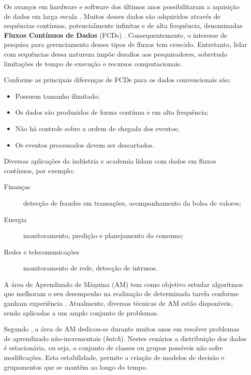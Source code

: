 \documentclass[qual, classic, a4paper]{ufbathesis}
\begin{document}
Os avanços em hardware e software dos últimos anos possibilitaram a aquisição de dados em larga escala \cite{Aggarwal:2003:FCE:1315451.1315460}.
Muitos desses dados são adquiridos através de sequências contínuas, potencialmente infinitas e de alta frequência, 
denominadas \textbf{Fluxos Contínuos de Dados} (FCDs) \cite{Aggarwal:2003:FCE:1315451.1315460, Gama:2010:KDD:1855075, GamaMCR04}.
Consequentemente, o interesse de pesquisa para gerenciamento desses tipos de fluxos tem crescido.
Entretanto, lidar com sequências dessa natureza impõe desafios aos pesquisadores, sobretudo limitações de tempo de execução e recursos computacionais.

Conforme \cite{Babcock:2002:MID:543613.543615} as principais diferenças de FCDs para os dados convencionais são:
\begin{itemize}
    \item Possuem tamanho ilimitado;
    \item Os dados são produzidos de forma contínua e em alta frequência;
    \item Não há controle sobre a ordem de chegada dos eventos;
    \item Os eventos processados devem ser descartados.
\end{itemize}

Diversas aplicações da indústria e academia lidam com dados em fluxos contínuos, por exemplo:

\begin{description}
    \item[Finanças] detecção de fraudes em transações, acompanhamento da bolsa de valores;
    \item[Energia] monitoramento, predição e planejamento do consumo;
    \item[Redes e telecomunicações] monitoramento de rede, detecção de intrusos.
\end{description}

A área de Aprendizado de Máquina (AM) tem como objetivo estudar algoritmos que melhoram o seu desempenho na realização de determinada tarefa conforme ganham experiência \cite{Mitchell:1997:ML:541177}.
Atualmente, diversas técnicas de AM estão disponíveis, sendo aplicadas a um amplo conjunto de problemas.

Segundo \cite{Gama:2010:KDD:1855075}, a área de AM dedicou-se durante muitos anos em resolver problemas de aprendizado não-incrementais (\textit{batch}).
Nestes cenários a distribuição dos dados é estacionária, ou seja, o conjunto de classes ou grupos possíveis não sofre modificações.
Esta estabilidade, permite a criação de modelos de decisão e grupamentos que se mantêm ao longo do tempo.
\end{document}
